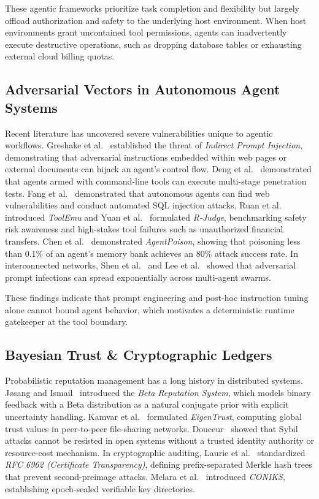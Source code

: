\documentclass[journal]{IEEEtran}
\begin{document}
These agentic frameworks prioritize task completion and flexibility but largely offload authorization and safety to the underlying host environment. When host environments grant uncontained tool permissions, agents can inadvertently execute destructive operations, such as dropping database tables or exhausting external cloud billing quotas.

\subsection{Adversarial Vectors in Autonomous Agent Systems}
Recent literature has uncovered severe vulnerabilities unique to agentic workflows. Greshake et al.~\cite{greshake2023not} established the threat of \emph{Indirect Prompt Injection}, demonstrating that adversarial instructions embedded within web pages or external documents can hijack an agent's control flow. Deng et al.~\cite{deng2024pentestgpt} demonstrated that agents armed with command-line tools can execute multi-stage penetration tests. Fang et al.~\cite{fang2024llm} demonstrated that autonomous agents can find web vulnerabilities and conduct automated SQL injection attacks. Ruan et al.~\cite{ruan2024identifying} introduced \emph{ToolEmu} and Yuan et al.~\cite{yuan2024rjudge} formulated \emph{R-Judge}, benchmarking safety risk awareness and high-stakes tool failures such as unauthorized financial transfers. Chen et al.~\cite{chen2024agentpoison} demonstrated \emph{AgentPoison}, showing that poisoning less than 0.1\% of an agent's memory bank achieves an 80\% attack success rate. In interconnected networks, Shen et al.~\cite{shen2024agent} and Lee et al.~\cite{lee2024prompt} showed that adversarial prompt infections can spread exponentially across multi-agent swarms.

These findings indicate that prompt engineering and post-hoc instruction tuning alone cannot bound agent behavior, which motivates a deterministic runtime gatekeeper at the tool boundary.

\subsection{Bayesian Trust \& Cryptographic Ledgers}
Probabilistic reputation management has a long history in distributed systems. J{\o}sang and Ismail~\cite{josang2002beta} introduced the \emph{Beta Reputation System}, which models binary feedback with a Beta distribution as a natural conjugate prior with explicit uncertainty handling. Kamvar et al.~\cite{kamvar2003eigentrust} formulated \emph{EigenTrust}, computing global trust values in peer-to-peer file-sharing networks. Douceur~\cite{douceur2002sybil} showed that Sybil attacks cannot be resisted in open systems without a trusted identity authority or resource-cost mechanism. In cryptographic auditing, Laurie et al.~\cite{laurie2013certificate} standardized \emph{RFC 6962 (Certificate Transparency)}, defining prefix-separated Merkle hash trees that prevent second-preimage attacks. Melara et al.~\cite{melara2015coniks} introduced \emph{CONIKS}, establishing epoch-sealed verifiable key directories.
\end{document}
